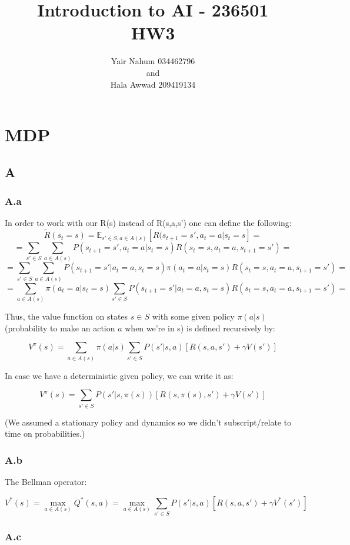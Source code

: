 \documentclass[12pt]{article}
\title{Introduction to AI - 236501\\HW3}
\author{Yair Nahum 034462796\\and\\Hala Awwad 209419134 }
\begin{document}
\maketitle


\section*{MDP}

\subsection*{A}

\subsubsection*{A.a}

In order to work with our R(s) instead of R(s,a,s') one can define the following:
$$\tilde R(s_t=s) = \mathbb {E}_{s'\in S, a\in A(s)}[R(s_{t+1}=s',a_t=a|s_t=s]=$$
$$= \sum_{s'\in S} \sum_{a\in A(s)} P(s_{t+1}=s',a_t=a|s_t=s) R(s_t=s,a_t=a,s_{t+1}=s') = $$
$$= \sum_{s'\in S} \sum_{a\in A(s)} P(s_{t+1}=s'|a_t=a,s_t=s)\pi(a_t=a|s_t=s) R(s_t=s,a_t=a,s_{t+1}=s') = $$
$$= \sum_{a\in A(s)} \pi(a_t=a|s_t=s) \sum_{s'\in S} P(s_{t+1}=s'|a_t=a,s_t=s) R(s_t=s,a_t=a,s_{t+1}=s') = $$

Thus, the value function on states $s\in S$ with some given policy $\pi(a|s)$ (probability to make an action $a$ when we're in s) is defined recursively by:

$$V^{\pi}(s) = \sum_{a\in A(s)} \pi(a|s) \sum_{s'\in S} P(s'|s,a) [R(s,a,s') + \gamma V(s')]$$

In case we have a deterministic given policy, we can write it as:

$$V^{\pi}(s) = \sum_{s'\in S} P(s'|s,\pi(s)) [R(s,\pi(s),s') + \gamma V(s')]$$

(We assumed a stationary policy and dynamics so we didn't subscript/relate to time on probabilities.)

\subsubsection*{A.b}

The Bellman operator:

$$V^*(s) = \max_{a\in A(s)}Q^*(s,a) = \max_{a\in A(s)} \sum_{s'\in S} P(s'|s,a) [R(s,a,s') + \gamma V^*(s')]$$

\subsubsection*{A.c}
\end{document}
